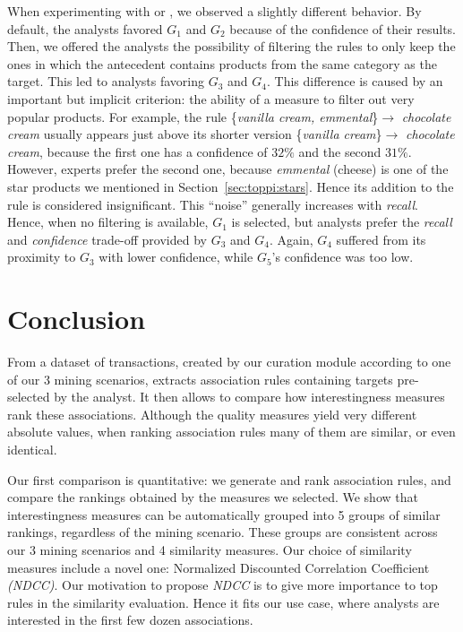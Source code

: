 When experimenting with \prodassocclient or \prodassocreceipt, we observed a slightly different behavior.
By default, the analysts favored $G_1$ and $G_2$ because of the confidence of their results.
Then, we offered the analysts the possibility of filtering the rules to only keep the ones in which the antecedent contains products from the same category as the target.
This led to analysts favoring $G_3$ and $G_4$.
This difference is caused by an important but implicit criterion: the ability of a measure to filter out very popular products.
For example, the rule \{{\em vanilla cream, emmental}\}$\rightarrow$ {\em chocolate cream}
usually appears just above its shorter version
\{{\em vanilla cream}\}$\rightarrow$ {\em chocolate cream},
because the first one has a confidence of $32\%$ and the second $31\%$.
However, experts prefer the second one,
because \textit{emmental} (cheese) is one of the star products we mentioned in Section~\ref{sec:toppi:stars}.
Hence its addition to the rule is considered insignificant.
This ``noise'' generally increases with {\em recall}.
Hence, when no filtering is available, $G_1$ is selected, but analysts prefer the {\em recall} and {\em confidence} trade-off provided by $G_3$ and $G_4$.
Again, $G_4$ suffered from its proximity to $G_3$ with lower confidence, while $G_5$'s confidence was too low.









\section{Conclusion}
\label{sec:capa:conc}

From a dataset of transactions,
created by our curation module according to one of our 3 mining scenarios,
\capa extracts association rules containing targets pre-selected by the analyst.
It then allows to compare how \nbm interestingness measures~\cite{GengACM06,Lenca2007} rank these associations.
Although the quality measures yield very different absolute values,
when ranking association rules many of them are similar, or even identical.

Our first comparison is quantitative:
we generate and rank association rules,
and compare the rankings obtained by the measures we selected.
We show that interestingness measures can be automatically grouped
into 5 groups of similar rankings, regardless of the mining scenario.
These groups are consistent across our 3 mining scenarios and 4 similarity measures.
Our choice of similarity measures include a novel one: Normalized Discounted Correlation Coefficient {\em{(NDCC)}}.
Our motivation to propose {\em NDCC} is to give more importance to top rules in the similarity evaluation.
Hence it fits our use case, where analysts are interested in the first few dozen associations.

